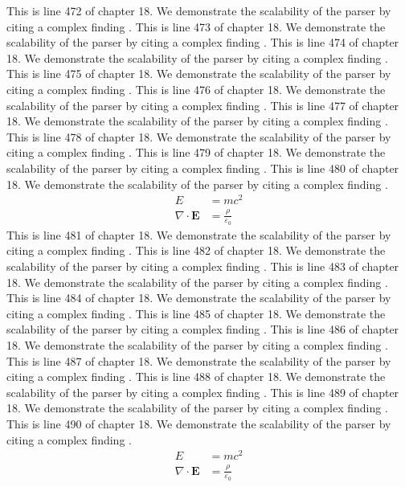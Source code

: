 This is line 472 of chapter 18. We demonstrate the scalability of the parser by citing a complex finding \cite{ref18_472}.
This is line 473 of chapter 18. We demonstrate the scalability of the parser by citing a complex finding \cite{ref18_473}.
This is line 474 of chapter 18. We demonstrate the scalability of the parser by citing a complex finding \cite{ref18_474}.
This is line 475 of chapter 18. We demonstrate the scalability of the parser by citing a complex finding \cite{ref18_475}.
This is line 476 of chapter 18. We demonstrate the scalability of the parser by citing a complex finding \cite{ref18_476}.
This is line 477 of chapter 18. We demonstrate the scalability of the parser by citing a complex finding \cite{ref18_477}.
This is line 478 of chapter 18. We demonstrate the scalability of the parser by citing a complex finding \cite{ref18_478}.
This is line 479 of chapter 18. We demonstrate the scalability of the parser by citing a complex finding \cite{ref18_479}.
This is line 480 of chapter 18. We demonstrate the scalability of the parser by citing a complex finding \cite{ref18_480}.
\begin{align*}
  E &= mc^2 \\
  \nabla \cdot \mathbf{E} &= \frac{\rho}{\varepsilon_0}
\end{align*}
This is line 481 of chapter 18. We demonstrate the scalability of the parser by citing a complex finding \cite{ref18_481}.
This is line 482 of chapter 18. We demonstrate the scalability of the parser by citing a complex finding \cite{ref18_482}.
This is line 483 of chapter 18. We demonstrate the scalability of the parser by citing a complex finding \cite{ref18_483}.
This is line 484 of chapter 18. We demonstrate the scalability of the parser by citing a complex finding \cite{ref18_484}.
This is line 485 of chapter 18. We demonstrate the scalability of the parser by citing a complex finding \cite{ref18_485}.
This is line 486 of chapter 18. We demonstrate the scalability of the parser by citing a complex finding \cite{ref18_486}.
This is line 487 of chapter 18. We demonstrate the scalability of the parser by citing a complex finding \cite{ref18_487}.
This is line 488 of chapter 18. We demonstrate the scalability of the parser by citing a complex finding \cite{ref18_488}.
This is line 489 of chapter 18. We demonstrate the scalability of the parser by citing a complex finding \cite{ref18_489}.
This is line 490 of chapter 18. We demonstrate the scalability of the parser by citing a complex finding \cite{ref18_490}.
\begin{align*}
  E &= mc^2 \\
  \nabla \cdot \mathbf{E} &= \frac{\rho}{\varepsilon_0}
\end{align*}
